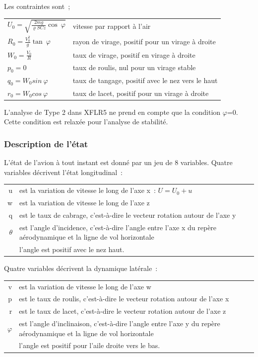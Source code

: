\documentclass[a4paper,twoside,12pt,dvips]{article}
\begin{document}
Les contraintes sont~;

\renewcommand{\arraystretch}{2}
\begin{tabular}{ll}
	$U_0 = \sqrt{\frac{2mg}{\varrho SCz} \cos~\varphi}$ &
	 	vitesse par rapport à l’air \\
	$R_0 = \frac{V_0^2}{g}\tan~\varphi$ &
	 	rayon de virage, positif pour un virage à droite \\
	$W_0 = \frac{V_0}{R}$ &
		taux de virage, positif en virage à droite \\
	$p_0 = 0$ &
		taux de roulis, nul pour un virage stable \\
	$q_0 = W_0 sin~\varphi$ &
		taux de tangage, positif avec le nez vers le haut \\
	$r_0 = W_0 cos~\varphi$ &
		taux de lacet, positif pour un virage à droite
\end{tabular}
\renewcommand{\arraystretch}{1}

L’analyse de Type 2 dans XFLR5 ne prend en compte que la condition
\textrm{${\varphi}$}=0. Cette condition est relaxée pour l’analyse de
stabilité.

\subsubsection{Description de l’état}

L’état de l’avion à tout instant est donné par un jeu de 8 variables.
Quatre variables décrivent l’état longitudinal~:

\begin{tabular}{rp{15cm}}
  u & est la variation de vitesse le long de l’axe x~: $U = U_0 + u$\\
  w & est la variation de vitesse le long de l’axe z\\
  q & est le taux de cabrage, c’est-à-dire le vecteur rotation autour
  de l’axe y\\
  $\theta$ & est l’angle d’incidence, c’est-à-dire l’angle entre l’axe x
  du repère aérodynamique et la ligne de vol horizontale\\
  &l’angle est positif avec le nez haut.
\end{tabular}

Quatre variables décrivent la dynamique latérale~:

\begin{tabular}{rp{15cm}}
  v & est la variation de vitesse le long de l’axe w\\
  p & est le taux de roulis, c’est-à-dire le vecteur rotation autour de
  l’axe x\\
  r & est le taux de lacet, c’est-à-dire le vecteur rotation autour
  de l’axe z\\
  $\varphi$ & est l’angle d’inclinaison, c’est-à-dire l’angle entre
  l’axe y du repère aérodynamique et la ligne de vol horizontale\\
  &l’angle est positif pour l’aile droite vers le bas.
\end{tabular}
\end{document}
